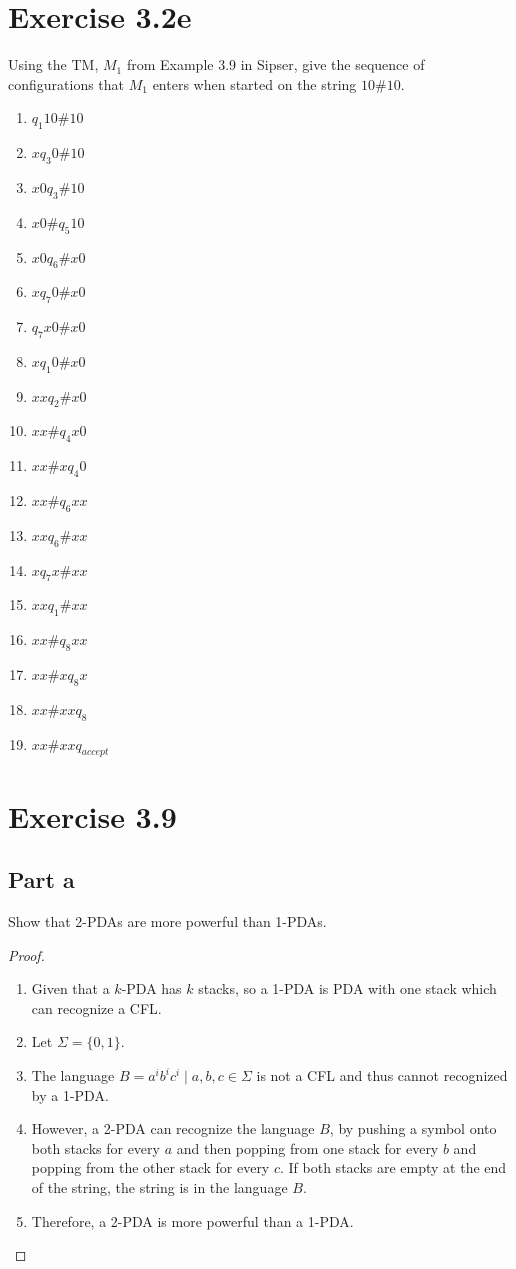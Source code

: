 \documentclass{article}
\newcommand{\where}{\mid}
\begin{document}
\section{Exercise 3.2e}
Using the TM, $M_1$ from Example 3.9 in Sipser, give the sequence of
configurations that $M_1$ enters when started on the string $10\#10$. 

\begin{enumerate}
  \item $q_1 10\#10$
  \item $x q_3 0\#10$
  \item $x0 q_3 \#10$
  \item $x0\# q_5 10$
  \item $x0 q_6 \#x0$
  \item $x q_7 0\#x0$
  \item $q_7 x0\#x0$
  \item $x q_1 0\#x0$
  \item $xx q_2 \#x0$
  \item $xx\# q_4 x0$
  \item $xx\#x q_4 0$
  \item $xx\# q_6 xx$
  \item $xx q_6 \#xx$
  \item $x q_7 x\#xx$
  \item $xx q_1 \#xx$
  \item $xx\# q_8 xx$
  \item $xx\#x q_8 x$
  \item $xx\#xx q_8$
  \item $xx\#xx q_{accept}$
\end{enumerate}

\section{Exercise 3.9}

\subsection{Part a}

Show that 2-PDAs are more powerful than 1-PDAs.

\begin{proof}
	\mbox{}
	\begin{enumerate}
	  \item Given that a $k$-PDA has $k$ stacks, so a 1-PDA is PDA with one stack
	  which can recognize a CFL.
	  \item Let $\Sigma = \{0, 1 \}$.
	  \item The language $B = {a^ib^ic^i \where a, b, c \in \Sigma}$ is not a CFL
	  and thus cannot recognized by a 1-PDA.
	  \item However, a 2-PDA can recognize the language $B$, by pushing a symbol
	  onto both stacks for every $a$ and then popping from one stack for every $b$ and
	  popping from the other stack for every $c$. If both stacks are empty at the
	  end of the string, the string is in the language $B$.
	  \item Therefore, a 2-PDA is more powerful than a 1-PDA. \qedhere
	\end{enumerate}
\end{proof}
\end{document}
